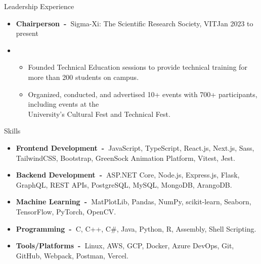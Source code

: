 \documentclass{resume}
\begin{document}
\begin{rSection}{Leadership Experience}
    \begin{itemize}[label=\null, leftmargin=*, parsep=0.5em]
        \item {
              \textbf{Chairperson~-~}Sigma-Xi: The Scientific Research Society, VIT\hfill Jan 2023 to present
              } \\
        \item {
              \vspace{-1.2\baselineskip}
              \begin{itemize}[label=$\bullet$]
                  \vspace{-\parskip}
                  \vspace{-\parsep}
                  \item {
                        Founded Technical Education sessions to provide technical training for more than 200 students on campus.
                        }
                  \item {
                        Organized, conducted, and advertised 10+ events with 700+ participants, including events at the \\
                        University's Cultural Fest and Technical Fest.
                        }
              \end{itemize}
              }
    \end{itemize}


\end{rSection}


\vspace{-0.5\baselineskip}


\begin{rSection}{Skills}
    \begin{itemize}[label=\null, leftmargin=*, parsep=0.5em]
        \item {
              \textbf{Frontend Development~-~}JavaScript, TypeScript, React.js, Next.js, Sass, TailwindCSS, Bootstrap, GreenSock
              Animation Platform, Vitest, Jest.
              }
        \item {
              \textbf{Backend Development~-~}ASP.NET Core, Node.js, Express.js, Flask, GraphQL, REST APIs, PostgreSQL, MySQL,
              MongoDB, ArangoDB.\@
              }
        \item {
              \textbf{Machine Learning~-~}MatPlotLib, Pandas, NumPy, scikit-learn, Seaborn, TensorFlow, PyTorch, OpenCV.\@
              }
        \item {
              \textbf{Programming~-~}C, C++, C\#, Java, Python, R, Assembly, Shell Scripting.
              }
        \item {
              \textbf{Tools/Platforms~-~}Linux, AWS, GCP, Docker, Azure DevOps, Git, GitHub, Webpack, Postman, Vercel.
              }
    \end{itemize}
\end{rSection}

\end{document}
